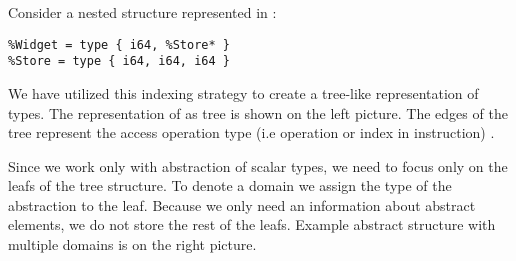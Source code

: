 \begin{example} \label{ex:fieldtrie}
Consider a nested structure represented in \LLVMIR:
\begin{verbatim}
%Widget = type { i64, %Store* }
%Store = type { i64, i64, i64 }
\end{verbatim}

We have utilized this indexing strategy to create a tree-like representation
of types. The representation of  as tree is shown on the
left picture. The edges of the tree represent the access operation type
(i.e  operation or index in  instruction)
\cite{LLVM:langref}.

Since we work only with abstraction of scalar types, we need to focus only on
the leafs of the tree structure. To denote a domain we assign the type of the
abstraction to the leaf. Because we only need an information about abstract
elements, we do not store the rest of the leafs. Example abstract structure
with multiple domains is on the right picture.


\end{example}
